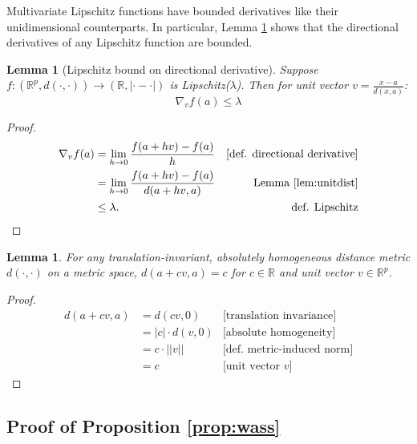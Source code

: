 \documentclass{article}
\newtheorem{lemma}[theorem]{Lemma}
\newcommand{\R}{\mathbb{R}}
\newcommand{\Rp}{\mathbb{R}^p}
\begin{document}
Multivariate Lipschitz functions have bounded derivatives like their unidimensional counterparts.
In particular, Lemma \ref{lem:lipbdsdd} shows that the directional derivatives of any Lipschitz function are bounded.
\begin{lemma}[Lipschitz bound on directional derivative]
\label{lem:lipbdsdd}
Suppose $f: (\Rp, d(\cdot, \cdot)) \to (\R, |\cdot - \cdot|)$ is Lipschitz($\lambda$).
Then for unit vector $v = \frac{x-a}{d(x,a)}$:
\begin{equation*}
    \nabla_v f(a) \leq \lambda
\end{equation*}
\end{lemma}
\begin{proof}
\begin{align*}
    \nabla_v f(a) 
    &= \lim_{h \to 0} \frac{f(a + hv) - f(a)}{h} &\text{[def. directional derivative]}\\
    &= \lim_{h \to 0} \frac{f(a + hv) - f(a)}{d(a + hv, a)} &\text{Lemma }\ref{lem:unitdist}\\
    &\leq \lambda. &\text{def. Lipschitz}
\end{align*}
\end{proof}

\begin{lemma}
\label{lem:unitdist}
For any translation-invariant, absolutely homogeneous distance metric $d(\cdot, \cdot)$ on a metric space, $d(a + cv, a) = c$ for $c \in \R$ and unit vector $v \in \Rp$.
\end{lemma}
\begin{proof}
\begin{align*}
    d(a + cv, a)
    &= d(cv, 0) &\text{[translation invariance]} \\
    &= |c| \cdot d(v, 0) &\text{[absolute homogeneity]} \\
    &= c \cdot ||v|| &\text{[def. metric-induced norm]} \\
    &= c &\text{[unit vector } v\text{]}
\end{align*}
\end{proof}

\subsection{Proof of Proposition \ref{prop:wass}}
\label{app:wass}

\end{document}
